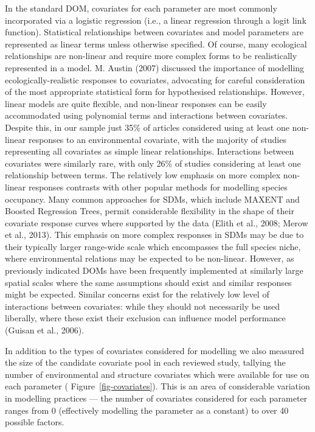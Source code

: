 \documentclass[
]{article}
\begin{document}
In the standard DOM, covariates for each parameter are most commonly
incorporated via a logistic regression (i.e., a linear regression
through a logit link function). Statistical relationships between
covariates and model parameters are represented as linear terms unless
otherwise specified. Of course, many ecological relationships are
non-linear and require more complex forms to be realistically
represented in a model. M. Austin (2007) discussed the importance of
modelling ecologically-realistic responses to covariates, advocating for
careful consideration of the most appropriate statistical form for
hypothesised relationships. However, linear models are quite flexible,
and non-linear responses can be easily accommodated using polynomial
terms and interactions between covariates. Despite this, in our sample
just 35\% of articles considered using at least one non-linear responses
to an environmental covariate, with the majority of studies representing
all covariates as simple linear relationships. Interactions between
covariates were similarly rare, with only 26\% of studies considering at
least one relationship between terms. The relatively low emphasis on
more complex non-linear responses contrasts with other popular methods
for modelling species occupancy. Many common approaches for SDMs, which
include MAXENT and Boosted Regression Trees, permit considerable
flexibility in the shape of their covariate response curves where
supported by the data (Elith et al., 2008; Merow et al., 2013). This
emphasis on more complex responses in SDMs may be due to their typically
larger range-wide scale which encompasses the full species niche, where
environmental relations may be expected to be non-linear. However, as
previously indicated DOMs have been frequently implemented at similarly
large spatial scales where the same assumptions should exist and similar
responses might be expected. Similar concerns exist for the relatively
low level of interactions between covariates: while they should not
necessarily be used liberally, where these exist their exclusion can
influence model performance (Guisan et al., 2006).

In addition to the types of covariates considered for modelling we also
measured the size of the candidate covariate pool in each reviewed
study, tallying the number of environmental and structure covariates
which were available for use on each parameter (
Figure~\ref{fig-covariates}). This is an area of considerable variation
in modelling practices --- the number of covariates considered for each
parameter ranges from 0 (effectively modelling the parameter as a
constant) to over 40 possible factors.
\end{document}
